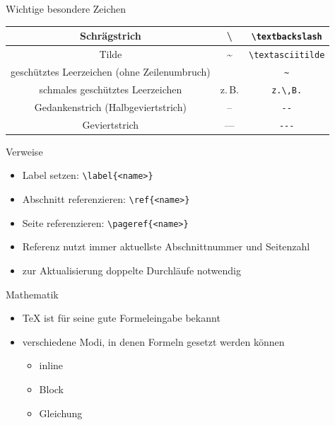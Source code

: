 \documentclass[presentation,aspectratio=169]{beamer}
\begin{document}
\begin{frame}[fragile]{Wichtige besondere Zeichen}
  \begin{tabular}{c|c|c}
    Schrägstrich                                  & \textbackslash   & \verb|\textbackslash| \\
    \hline
    Tilde                                         & \textasciitilde  & \verb|\textasciitilde| \\
    \hline
    geschütztes Leerzeichen (ohne Zeilenumbruch)  & ~                & \verb|~| \\
    \hline
    schmales geschütztes Leerzeichen              & z.\,B.           & \verb|z.\,B.| \\
    \hline
    Gedankenstrich (Halbgeviertstrich)            & --               & \verb|--| \\
    \hline
    Geviertstrich                                 & ---              & \verb|---|
  \end{tabular}
\end{frame}

\begin{frame}[fragile]{Verweise}
  \begin{itemize}
    \item Label setzen: \verb|\label{<name>}|
    \item Abschnitt referenzieren: \verb|\ref{<name>}|
    \item Seite referenzieren: \verb|\pageref{<name>}|
    \item Referenz nutzt immer aktuellste Abschnittnummer und Seitenzahl
    \item zur Aktualisierung doppelte Durchläufe notwendig
  \end{itemize}
\end{frame}

\begin{frame}{Mathematik}
  \begin{itemize}
    \item \TeX{} ist für seine gute Formeleingabe bekannt
    \item verschiedene Modi, in denen Formeln gesetzt werden können
      \begin{itemize}
        \item inline
        \item Block
        \item Gleichung
      \end{itemize}
  \end{itemize}
\end{frame}
\end{document}
